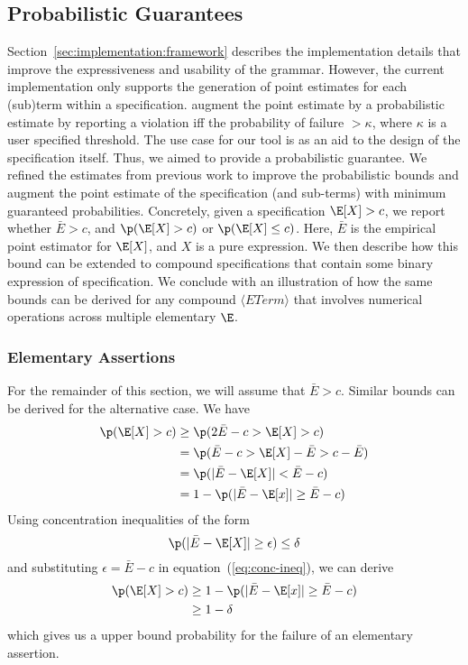 \subsection{Probabilistic Guarantees}
\label{sec:implementation:prob}
Section~\ref{sec:implementation:framework} describes the implementation details that improve the expressiveness and usability of the grammar. 
However, the current implementation only supports the generation of point estimates for each (sub)term within a specification. 
\citet{albarghouthi2019fairness} augment the point estimate by a probabilistic estimate by reporting a violation iff the probability of failure $> \kappa$, where $\kappa$ is a user specified threshold. 
The use case for our tool is as an aid to the design of the specification itself. 
Thus, we aimed to provide a probabilistic guarantee.
We refined the estimates from previous work to improve the probabilistic bounds and augment the point estimate of the specification (and sub-terms) with minimum guaranteed probabilities.
Concretely, given a specification $\E[X] > c$, we report whether $\bar{E} > c$, and $\p(\E[X] > c)$ or $\p(\E[X] \leq c)$. 
Here, $\bar{E}$ is the empirical point estimator for $\E[X]$, and $X$ is a pure expression.
We then describe how this bound can be extended to compound specifications that contain some binary expression of specification. 
We conclude with an illustration of how the same bounds can be derived for any compound $\langle ETerm \rangle$ that involves numerical operations across multiple elementary $\E$.

\subsubsection{Elementary Assertions}
\label{sec:implementation:prob:elem}
For the remainder of this section, we will assume that $\bar{E} > c$.
Similar bounds can be derived for the alternative case. 
We have
\begin{align*}
\p(\E[X] > c) &\geq \p(2\bar{E} - c > \E[X]  > c ) \\
                    & = \p (\bar{E} -c > \E[X] - \bar{E} > c - \bar{E}) \\
                    & = \p(|\bar{E}-\E[X]| < \bar{E} - c)  \\
                    &= 1 - \p(|\bar{E} - \E[x]| \geq \bar{E} - c)
\end{align*}
Using concentration inequalities of the form
\begin{equation}
    \p(|\bar{E} - \E[X]| \geq \epsilon) \leq \delta
    \label{eq:conc-ineq}
\end{equation}
and substituting $\epsilon = \bar{E} - c$ in equation~(\ref{eq:conc-ineq}), we can derive 
\begin{align*}
    \p(\E[X] > c) &\geq 1 - \p(|\bar{E} - \E[x]| \geq \bar{E} - c) \\
        & \geq 1 - \delta
\end{align*}
which gives us a upper bound probability for the failure of an elementary assertion.

